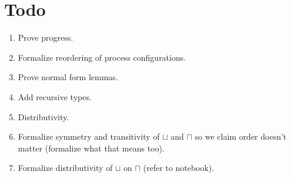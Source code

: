 \documentclass[11pt]{article}
\theoremstyle{plain}
\theoremstyle{definition}
\theoremstyle{remark}
\DeclarePairedDelimiter\parens{(}{)}             %
\newcommand\lolli{\multimap}
\newcommand\intersect{\mathbin{\sqcap}}
\newcommand\union{\mathbin{\sqcup}}
\newcommand\irb[1]{\texttt{#1}}
\newcommand{\emptyCtx}{\emptyset}
\newcommand\typeProc[3]{#1 :: \parens{#2 : #3}}
\newcommand\typeS[4]{#1 \vdash \typeProc{#2}{#3}{#4}}
\newcommand\proc[2]{\irb{proc}_{#1}\parens{#2}}
\newcommand\pred[1]{\mathcal{P}\parens*{#1}}
\begin{document}

\section{Todo}

\begin{enumerate}
  \item Prove progress.
  \item Formalize reordering of process configurations.
  \item Prove normal form lemmas.
  \item Add recursive types.
  \item Distributivity.
  \item Formalize symmetry and transitivity of $\union$ and $\intersect$ so we claim order doesn't matter (formalize what that means too).
  \item Formalize distributivity of $\union$ on $\intersect$ (refer to notebook).
\end{enumerate}
\end{document}
